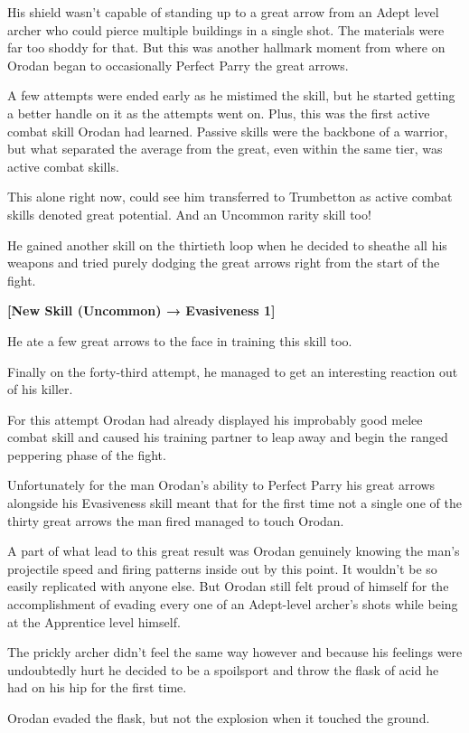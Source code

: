 \documentclass[a4paper,10pt]{book}
\begin{document}
His shield wasn’t capable of standing up to a great arrow from an Adept level archer who could pierce multiple buildings in a single shot. The materials were far too shoddy for that. But this was another hallmark moment from where on Orodan began to occasionally Perfect Parry the great arrows.\par
A few attempts were ended early as he mistimed the skill, but he started getting a better handle on it as the attempts went on. Plus, this was the first active combat skill Orodan had learned. Passive skills were the backbone of a warrior, but what separated the average from the great, even within the same tier, was active combat skills.\par
This alone right now, could see him transferred to Trumbetton as active combat skills denoted great potential. And an Uncommon rarity skill too!\par
He gained another skill on the thirtieth loop when he decided to sheathe all his weapons and tried purely dodging the great arrows right from the start of the fight.\par
\textbf{[New Skill (Uncommon) → Evasiveness 1]}\par
He ate a few great arrows to the face in training this skill too.\par
Finally on the forty-third attempt, he managed to get an interesting reaction out of his killer.\par
For this attempt Orodan had already displayed his improbably good melee combat skill and caused his training partner to leap away and begin the ranged peppering phase of the fight.\par
Unfortunately for the man Orodan’s ability to Perfect Parry his great arrows alongside his Evasiveness skill meant that for the first time not a single one of the thirty great arrows the man fired managed to touch Orodan.\par
A part of what lead to this great result was Orodan genuinely knowing the man’s projectile speed and firing patterns inside out by this point. It wouldn’t be so easily replicated with anyone else. But Orodan still felt proud of himself for the accomplishment of evading every one of an Adept-level archer’s shots while being at the Apprentice level himself.\par
The prickly archer didn’t feel the same way however and because his feelings were undoubtedly hurt he decided to be a spoilsport and throw the flask of acid he had on his hip for the first time.\par
Orodan evaded the flask, but not the explosion when it touched the ground.\par
\end{document}
